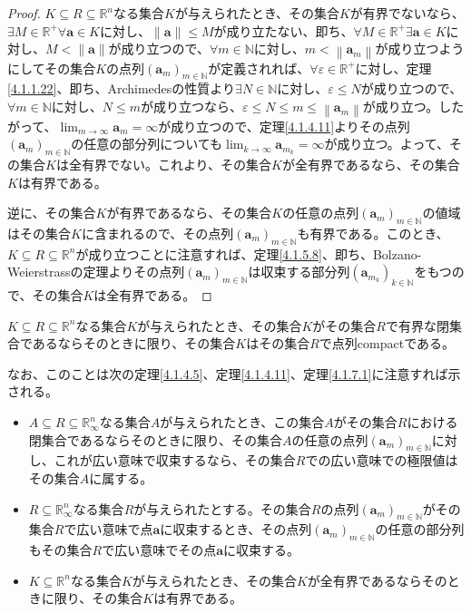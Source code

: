 \documentclass[dvipdfmx]{jsarticle}
\begin{document}
\begin{proof}
$K \subseteq R \subseteq \mathbb{R}^{n}$なる集合$K$が与えられたとき、その集合$K$が有界でないなら、$\exists M \in \mathbb{R}^{+}\forall\mathbf{a} \in K$に対し、$\left\| \mathbf{a} \right\| \leq M$が成り立たない、即ち、$\forall M \in \mathbb{R}^{+}\exists\mathbf{a} \in K$に対し、$M < \left\| \mathbf{a} \right\|$が成り立つので、$\forall m \in \mathbb{N}$に対し、$m < \left\| \mathbf{a}_{m} \right\|$が成り立つようにしてその集合$K$の点列$\left( \mathbf{a}_{m} \right)_{m \in \mathbb{N}}$が定義されれば、$\forall\varepsilon \in \mathbb{R}^{+}$に対し、定理\ref{4.1.1.22}、即ち、Archimedesの性質より$\exists N \in \mathbb{N}$に対し、$\varepsilon \leq N$が成り立つので、$\forall m \in \mathbb{N}$に対し、$N \leq m$が成り立つなら、$\varepsilon \leq N \leq m \leq \left\| \mathbf{a}_{m} \right\|$が成り立つ。したがって、$\lim_{m \rightarrow \infty}\mathbf{a}_{m} = \infty$が成り立つので、定理\ref{4.1.4.11}よりその点列$\left( \mathbf{a}_{m} \right)_{m \in \mathbb{N}}$の任意の部分列についても$\lim_{k \rightarrow \infty}\mathbf{a}_{m_{k}} = \infty$が成り立つ。よって、その集合$K$は全有界でない。これより、その集合$K$が全有界であるなら、その集合$K$は有界である。\par
逆に、その集合$K$が有界であるなら、その集合$K$の任意の点列$\left( \mathbf{a}_{m} \right)_{m \in \mathbb{N}}$の値域はその集合$K$に含まれるので、その点列$\left( \mathbf{a}_{m} \right)_{m \in \mathbb{N}}$も有界である。このとき、$K \subseteq R \subseteq \mathbb{R}^{n}$が成り立つことに注意すれば、定理\ref{4.1.5.8}、即ち、Bolzano-Weierstrassの定理よりその点列$\left( \mathbf{a}_{m} \right)_{m \in \mathbb{N}}$は収束する部分列$\left( \mathbf{a}_{m_{k}} \right)_{k \in \mathbb{N}}$をもつので、その集合$K$は全有界である。
\end{proof}
\begin{thm}\label{4.1.7.6}
$K \subseteq R \subseteq \mathbb{R}^{n}$なる集合$K$が与えられたとき、その集合$K$がその集合$R$で有界な閉集合であるならそのときに限り、その集合$K$はその集合$R$で点列compactである。
\end{thm}\par
なお、このことは次の定理\ref{4.1.4.5}、定理\ref{4.1.4.11}、定理\ref{4.1.7.1}に注意すれば示される。
\begin{itemize}
\item
  $A \subseteq R \subseteq \mathbb{R}_{\infty}^{n}$なる集合$A$が与えられたとき、この集合$A$がその集合$R$における閉集合であるならそのときに限り、その集合$A$の任意の点列$\left( \mathbf{a}_{m} \right)_{m \in \mathbb{N}}$に対し、これが広い意味で収束するなら、その集合$R$での広い意味での極限値はその集合$A$に属する。
\item
  $R \subseteq \mathbb{R}_{\infty}^{n}$なる集合$R$が与えられたとする。その集合$R$の点列$\left( \mathbf{a}_{m} \right)_{m \in \mathbb{N}}$がその集合$R$で広い意味で点$\mathbf{a}$に収束するとき、その点列$\left( \mathbf{a}_{m} \right)_{m \in \mathbb{N}}$の任意の部分列もその集合$R$で広い意味でその点$\mathbf{a}$に収束する。
\item
  $K \subseteq \mathbb{R}^{n}$なる集合$K$が与えられたとき、その集合$K$が全有界であるならそのときに限り、その集合$K$は有界である。
\end{itemize}
\end{document}
